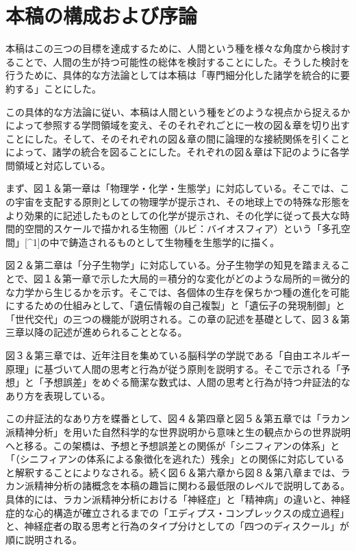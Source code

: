 \documentclass[
]{ltjsarticle}
\begin{document}
\section{本稿の構成および序論}\label{ux672cux7a3fux306eux69cbux6210ux304aux3088ux3073ux5e8fux8ad6}

本稿はこの三つの目標を達成するために、人間という種を様々な角度から検討することで、人間の生が持つ可能性の総体を検討することにした。そうした検討を行うために、具体的な方法論としては本稿は「専門細分化した諸学を統合的に要約する」ことにした。

この具体的な方法論に従い、本稿は人間という種をどのような視点から捉えるかによって参照する学問領域を変え、そのそれぞれごとに一枚の図＆章を切り出すことにした。そして、そのそれぞれの図＆章の間に論理的な接続関係を引くことによって、諸学の統合を図ることにした。それぞれの図＆章は下記のように各学問領域と対応している。

まず、図１＆第一章は「物理学・化学・生態学」に対応している。そこでは、この宇宙を支配する原則としての物理学が提示され、その地球上での特殊な形態をより効果的に記述したものとしての化学が提示され、その化学に従って長大な時間的空間的スケールで描かれる生物圏（ルビ：バイオスフィア）という「多孔空間」{[}\^{}1{]}の中で鋳造されるものとして生物種を生態学的に描く。

図２＆第二章は「分子生物学」に対応している。分子生物学の知見を踏まえることで、図１＆第一章で示した大局的＝積分的な変化がどのような局所的＝微分的な力学から生じるかを示す。そこでは、各個体の生存を保ちかつ種の進化を可能にするための仕組みとして、「遺伝情報の自己複製」と「遺伝子の発現制御」と「世代交代」の三つの機能が説明される。この章の記述を基礎として、図３＆第三章以降の記述が進められることとなる。

図３＆第三章では、近年注目を集めている脳科学の学説である「自由エネルギー原理」に基づいて人間の思考と行為が従う原則を説明する。そこで示される「予想」と「予想誤差」をめぐる簡潔な数式は、人間の思考と行為が持つ弁証法的なあり方を表現している。

この弁証法的なあり方を蝶番として、図４＆第四章と図５＆第五章では「ラカン派精神分析」を用いた自然科学的な世界説明から意味と生の観点からの世界説明へと移る。この架橋は、予想と予想誤差との関係が「シニフィアンの体系」と「（シニフィアンの体系による象徴化を逃れた）残余」との関係に対応していると解釈することによりなされる。続く図６＆第六章から図８＆第八章までは、ラカン派精神分析の諸概念を本稿の趣旨に関わる最低限のレベルで説明してある。具体的には、ラカン派精神分析における「神経症」と「精神病」の違いと、神経症的な心的構造が確立されるまでの「エディプス・コンプレックスの成立過程」と、神経症者の取る思考と行為のタイプ分けとしての「四つのディスクール」が順に説明される。
\end{document}
